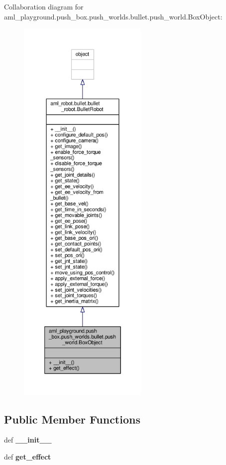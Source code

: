 Collaboration diagram for aml\-\_\-playground.\-push\-\_\-box.\-push\-\_\-worlds.\-bullet.\-push\-\_\-world.\-Box\-Object\-:\nopagebreak
\begin{figure}[H]
\begin{center}
\leavevmode
\includegraphics[height=550pt]{classaml__playground_1_1push__box_1_1push__worlds_1_1bullet_1_1push__world_1_1_box_object__coll__graph}
\end{center}
\end{figure}
\subsection*{Public Member Functions}
\begin{DoxyCompactItemize}
\item 
\hypertarget{classaml__playground_1_1push__box_1_1push__worlds_1_1bullet_1_1push__world_1_1_box_object_a40e3b09707ed36e2d97f5a28da68b39c}{def {\bfseries \-\_\-\-\_\-init\-\_\-\-\_\-}}\label{classaml__playground_1_1push__box_1_1push__worlds_1_1bullet_1_1push__world_1_1_box_object_a40e3b09707ed36e2d97f5a28da68b39c}

\item 
\hypertarget{classaml__playground_1_1push__box_1_1push__worlds_1_1bullet_1_1push__world_1_1_box_object_a9f10a558dc0bdcc193b2f1c9ae8e6808}{def {\bfseries get\-\_\-effect}}\label{classaml__playground_1_1push__box_1_1push__worlds_1_1bullet_1_1push__world_1_1_box_object_a9f10a558dc0bdcc193b2f1c9ae8e6808}

\end{DoxyCompactItemize}


